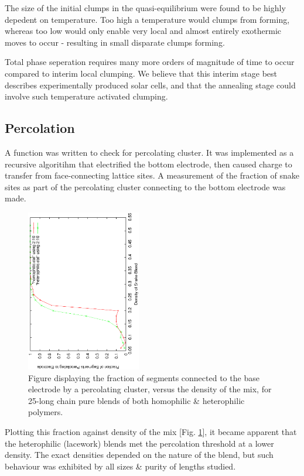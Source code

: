 \documentclass[twocolumn,a4,notitlepage]{report}
\begin{document}
The size of the initial clumps in the quasi-equilibrium were found to be
highly depedent on temperature. Too high a temperature would clumps from
forming, whereas too low would only enable very local and almost entirely
exothermic moves to occur - resulting in small disparate clumps forming. 

Total phase seperation requires many more orders of magnitude of time to
occur compared to interim local clumping. We believe that this interim stage
best describes experimentally produced solar cells, and that the annealing
stage could involve such temperature activated clumping.

\subsection{Percolation}

A function was written to check for percolating cluster. It was implemented
as a recursive algoritihm that electrified the bottom electrode, then caused
charge to transfer from face-connecting lattice sites. A measurement of the
fraction of snake sites as part of the percolating cluster connecting to the
bottom electrode was made. 

\begin{figure}[htb]
\centering
\label{percolate}
\includegraphics[width=5cm,angle=270]{figures/percolate.eps}
\caption{Figure displaying the fraction of segments connected to the base
electrode by a percolating cluster, versus the density of the mix, for
25-long chain pure blends of both homophilic \& heterophilic polymers.}
\end{figure}

Plotting this fraction against density of the mix [Fig. \ref{percolate}], it
became apparent that the heterophilic (lacework) blends met the 
percolation threshold at a lower density. The exact densities depended on the
nature of the blend, but such behaviour was exhibited by all sizes \& purity
of lengths studied.
\end{document}
